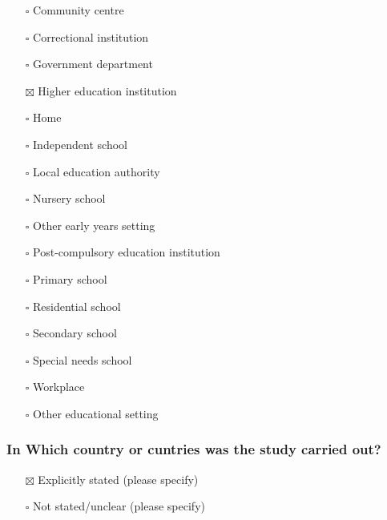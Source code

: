 \documentclass[
  doc, a4paper]{apa7}
\providecommand{\tightlist}{%
  \setlength{\itemsep}{0pt}\setlength{\parskip}{0pt}}
\begin{document}
\begin{itemize}
\tightlist
\item[$\square$]
  Community centre\\
\item[$\square$]
  Correctional institution\\
\item[$\square$]
  Government department\\
\item[$\boxtimes$]
  Higher education institution\\
\item[$\square$]
  Home\\
\item[$\square$]
  Independent school\\
\item[$\square$]
  Local education authority\\
\item[$\square$]
  Nursery school\\
\item[$\square$]
  Other early years setting\\
\item[$\square$]
  Post-compulsory education institution\\
\item[$\square$]
  Primary school\\
\item[$\square$]
  Residential school\\
\item[$\square$]
  Secondary school\\
\item[$\square$]
  Special needs school\\
\item[$\square$]
  Workplace\\
\item[$\square$]
  Other educational setting
\end{itemize}

\subsubsection{In Which country or cuntries was the study carried out?}\label{in-which-country-or-cuntries-was-the-study-carried-out}

\begin{itemize}
\tightlist
\item[$\boxtimes$]
  Explicitly stated (please specify)\\
\item[$\square$]
  Not stated/unclear (please specify)
\end{itemize}
\end{document}
